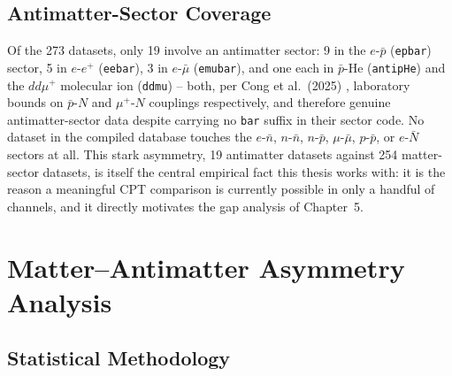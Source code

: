 \documentclass[main]{subfiles}
\begin{document}
\subsection{Antimatter-Sector Coverage}

Of the 273 datasets, only 19 involve an antimatter sector: 9 in the
$e$-$\bar p$ (\texttt{epbar}) sector, 5 in $e$-$e^+$ (\texttt{eebar}), 3
in $e$-$\bar\mu$ (\texttt{emubar}), and one each in $\bar p$-He
(\texttt{antipHe}) and the $dd\mu^+$ molecular ion (\texttt{ddmu}) --
both, per Cong et al.\ (2025) \cite{Cong2025}, laboratory bounds on
$\bar p$-$N$ and $\mu^+$-$N$ couplings respectively, and therefore genuine
antimatter-sector data despite carrying no \texttt{bar} suffix in their
sector code. No dataset in the compiled database touches the $e$-$\bar n$,
$n$-$\bar n$, $n$-$\bar p$, $\mu$-$\bar\mu$, $p$-$\bar p$, or $e$-$\bar N$
sectors at all. This stark asymmetry, 19 antimatter datasets
against 254 matter-sector datasets, is itself the central empirical fact
this thesis works with: it is the reason a meaningful CPT comparison is
currently possible in only a handful of channels, and it directly motivates
the gap analysis of Chapter~5.

\section{Matter--Antimatter Asymmetry Analysis}
\label{sec:asymmetry}

\subsection{Statistical Methodology}
\end{document}
